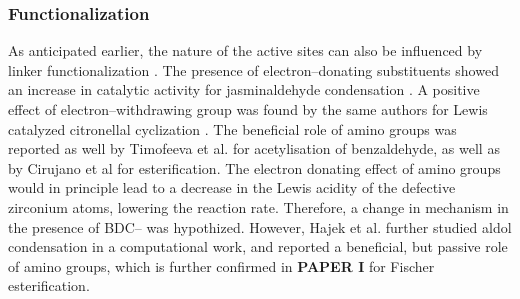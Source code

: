 \subsubsection*{Functionalization}
As anticipated earlier, the nature of the active sites can also be influenced by linker functionalization \cite{kandiah2010synthesis, kandiah2010post, kim2012discovery}. 
The presence of electron--donating substituents showed an increase in catalytic activity for jasminaldehyde condensation \cite{vermoortele2011amino}. A positive effect of electron--withdrawing group was found by the same authors for Lewis catalyzed citronellal cyclization \cite{vermoortele2012electronic}. The beneficial role of amino groups was reported as well by Timofeeva et al. \cite{timofeeva2014effects} for acetylisation of benzaldehyde, as well as by Cirujano et al \cite{cirujano2015zirconium, cirujano2015conversion} for esterification. The electron donating effect of amino groups would in principle lead to a decrease in the Lewis acidity of the defective zirconium atoms, lowering the reaction rate. Therefore, a change in mechanism in the presence of BDC-- was hypothized. However, Hajek et al. further studied aldol condensation in a computational work\cite{hajek2015mechanistic}, and reported a beneficial, but passive role of amino groups, which is further confirmed in \textbf{PAPER I} for Fischer esterification. 

